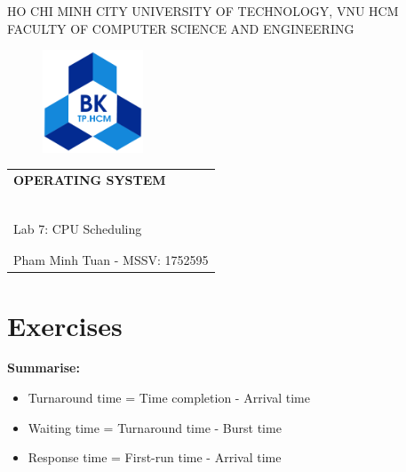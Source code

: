 \documentclass[a4paper]{article}
\newcommand{\tf}{\textbf}
\begin{document}
    \begin{titlepage}
        \begin{center}
            HO CHI MINH CITY UNIVERSITY OF TECHNOLOGY, VNU HCM \\
            FACULTY OF COMPUTER SCIENCE AND ENGINEERING
        \end{center}

        \vspace{1cm}

        \begin{figure}[h!]
            \begin{center}
                \includegraphics[width=3cm]{hcmut.png}
            \end{center}
        \end{figure}

        \vspace{1cm}

        \begin{center}
            \begin{tabular}{c}
                \multicolumn{1}{l}{\tf{\LARGE OPERATING SYSTEM}} \\
                ~~\\
                \hline
                \\
                \multicolumn{1}{l}{\LARGE Lab 7: CPU Scheduling} \\
                \\
                \hline
                \\
                \hspace{5cm} Pham Minh Tuan - MSSV: 1752595
            \end{tabular}
        \end{center}
    \end{titlepage}

\newpage

\section{Exercises} 

\tf{Summarise:}
\begin{mybox}
    \begin{itemize}
        \item Turnaround time = Time completion - Arrival time
        \item Waiting time = Turnaround time - Burst time
        \item Response time = First-run time - Arrival time
    \end{itemize}
\end{mybox}
\end{document}

